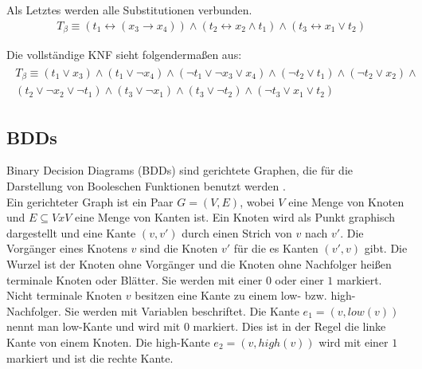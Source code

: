\documentclass[a4,abstract=on]{scrartcl}
\begin{document}
Als Letztes werden alle Substitutionen verbunden.\\
\begin{align*}
& T_\beta \equiv(t_1 \leftrightarrow (x_3 \rightarrow x_4)) \wedge (t_2 \leftrightarrow x_2 \wedge t_1) \wedge (t_3 \leftrightarrow x_1 \vee t_2)
\end{align*}

Die vollständige KNF sieht folgendermaßen aus:\\
\begin{align*}
\begin{aligned}
T_\beta \equiv (t_1 \vee  x_3) \wedge (t_1 \vee \neg x_4) \wedge (\neg t_1 \vee \neg x_3 \vee x_4) \wedge (\neg t_2 \vee  t_1) \wedge (\neg t_2 \vee x_2) \wedge \\
(t_2 \vee \neg x_2 \vee \neg t_1) \wedge (t_3 \vee  \neg x_1) \wedge (t_3 \vee \neg t_2) \wedge (\neg t_3 \vee x_1 \vee t_2)
\end{aligned}
\end{align*}

\subsection{BDDs}
Binary Decision Diagrams (BDDs) sind gerichtete Graphen, die für die Darstellung von Booleschen Funktionen benutzt werden \cite[vgl.][Seite 109-110]{bdd}.\\
Ein gerichteter Graph ist ein Paar $G=(V, E)$, wobei $V$ eine Menge von Knoten und $E \subseteq V x V$  eine Menge von Kanten ist. Ein Knoten wird als Punkt graphisch dargestellt und eine Kante $(v, v')$ durch einen Strich von $v$ nach $v'$. Die Vorgänger eines Knotens $v$ sind die Knoten $v'$ für die es Kanten $(v', v)$ gibt. Die Wurzel ist der Knoten ohne Vorgänger und die Knoten ohne Nachfolger heißen terminale Knoten oder Blätter. Sie werden mit einer $0$ oder einer $1$ markiert. Nicht terminale Knoten $v$ besitzen eine Kante zu einem low- bzw. high- Nachfolger. Sie werden mit Variablen beschriftet. Die Kante $e_1 = (v, low(v))$ nennt man low-Kante und wird mit $0$ markiert. Dies ist in der Regel die linke Kante von einem Knoten. Die high-Kante $e_2 = (v, high(v))$ wird mit einer $1$ markiert und ist die rechte Kante.
\end{document}
